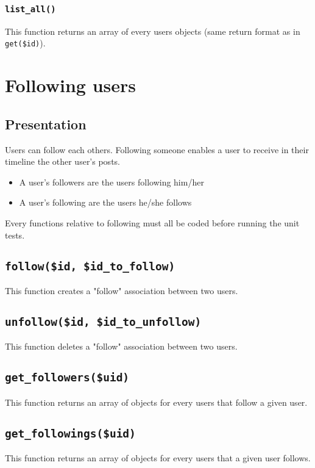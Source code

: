 \documentclass[twoside,a4paper,12pt]{article}
\begin{document}
\subsubsection{\texttt{list\_all()}}
This function returns an array of every users objects (same return format as in \texttt{get(\$id)}).

\section{Following users}

\subsection{Presentation}
Users can follow each others. Following someone enables a user to receive in their timeline the other user's posts.

\begin{itemize}
\item A user's followers are the users following him/her
\item A user's following are the users he/she follows
\end{itemize}

Every functions relative to following must all be coded before running the unit tests. 

\subsection{\texttt{follow(\$id, \$id\_to\_follow)}}
This function creates a "follow" association between two users.

\subsection{\texttt{unfollow(\$id, \$id\_to\_unfollow)}}
This function deletes a "follow" association between two users.

\subsection{\texttt{get\_followers(\$uid)}}
This function returns an array of objects for every users that follow a given user.

\subsection{\texttt{get\_followings(\$uid)}}
This function returns an array of objects for every users that a given user follows.
\end{document}
